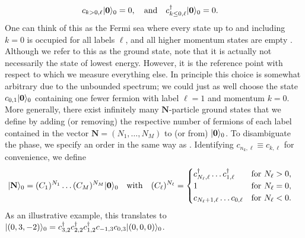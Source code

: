 \begin{align*}
c_{k>0,\ell} \Ket{\textbf{0}}_0 &=0,\quad\text{and}\quad c_{k\le 0,\ell}^\dagger \Ket{\textbf{0}}_0 = 0.
\end{align*}
One can think of this as the Fermi sea where every state up to and including $k=0$ is occupied for all labels $\ell$, and all higher momentum states are empty \cite{Bosonization_DelftSchoeller_1998}.
Although we refer to this as the ground state, note that it is actually not necessarily the state of lowest energy.
However, it is the reference point with respect to which we measure everything else.
In principle this choice is somewhat arbitrary due to the unbounded spectrum; we could just as well choose the state $c_{0,1} \Ket{\textbf{0}}_0$ containing one fewer fermion with label $\ell=1$ and momentum $k=0$.
More generally, there exist infinitely many $\textbf{N}$-particle ground states that we define by adding (or removing) the respective number of fermions of each label contained in the vector $\textbf{N}=(N_1,\dots,N_M)$ to (or from) $\Ket{\textbf{0}}_0$.
To disambiguate the phase, we specify an order in the same way as \cite{Bosonization_DelftSchoeller_1998}.
Identifying $c_{n_k,\ell} \equiv c_{k,\ell}$ for convenience, we define
\begin{align*}
\Ket{\textbf{N}}_0 &= (C_1)^{N_1} \dots (C_M)^{N_M} \Ket{\textbf{0}}_0\quad\text{with} \quad (C_\ell)^{N_\ell} = \begin{cases} c_{N_\ell,\ell}^\dagger \dots c_{1,\ell}^\dagger & \text{for}\ N_\ell>0,\\
1 & \text{for}\ N_\ell = 0,\\ c_{N_\ell+1,\ell}\dots c_{0,\ell} & \text{for}\ N_\ell < 0. \end{cases}
\end{align*}
As an illustrative example, this translates to $\Ket{(0,3,-2)}_0 = c_{3,2}^\dagger c_{2,2}^\dagger c_{1,2}^\dagger c_{-1,3} c_{0,3} \Ket{(0,0,0)}_0$.\\
